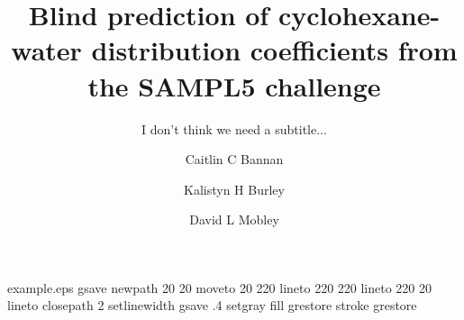%
%
%
%
%
\begin{filecontents*}{example.eps}
gsave
newpath
  20 20 moveto
  20 220 lineto
  220 220 lineto
  220 20 lineto
closepath
2 setlinewidth
gsave
  .4 setgray fill
grestore
stroke
grestore
\end{filecontents*}
%
\RequirePackage{fix-cm}
%
\documentclass[smallextended]{svjour3}       %
%
\smartqed  %
%
\usepackage{graphicx}
%
%
%
%
%


\title{Blind prediction of cyclohexane-water distribution coefficients from the SAMPL5 challenge}
\thanks{NSF, green planet (their NSF), anything else?}

\subtitle{I don't think we need a subtitle...}


\author{Caitlin C Bannan         \and
        Kalistyn H Burley \and
        David L Mobley
}



